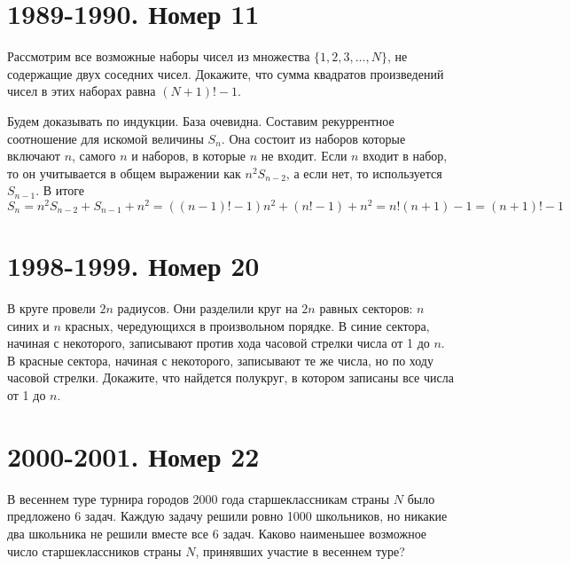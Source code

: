 \documentclass[11pt, a4paper]{problems_template}
\begin{document}
\chapter{1989-1990. Номер 11}

\begin{exercise}
Рассмотрим все возможные наборы чисел из множества $\{1, 2, 3, \dots, N\}$, не содержащие двух соседних чисел. Докажите, что сумма квадратов произведений чисел в этих наборах равна $(N+1)!-1$.
\end{exercise}

\begin{Solution}
Будем доказывать по индукции. База очевидна. Составим рекуррентное соотношение для искомой величины $S_{n}$. Она состоит из наборов которые включают $n$, самого $n$ и наборов, в которые $n$ не входит. Если $n$ входит в набор, то он учитывается в общем выражении как $n^{2}S_{n-2}$, а если нет, то используется $S_{n-1}$. В итоге
$$
S_{n} = n^{2}S_{n-2}+S_{n-1}+n^{2} = ((n-1)! - 1)n^{2} + (n! - 1) + n^{2} = n!(n + 1) - 1 = (n + 1)! - 1
$$  
\end{Solution}

\chapter{1998-1999. Номер 20}

\begin{exercise}
В круге провели $2n$ радиусов. Они разделили круг на $2n$ равных секторов: $n$ синих и $n$ красных, чередующихся в произвольном порядке. В синие сектора, начиная с некоторого, записывают против хода часовой стрелки числа от 1 до $n$. В красные сектора, начиная с некоторого, записывают те же числа, но по ходу часовой стрелки. Докажите, что найдется полукруг, в котором записаны все числа от 1 до $n$.
\end{exercise}

\begin{Solution}

\end{Solution}



\chapter{2000-2001. Номер 22}

\begin{exercise}
В весеннем туре турнира городов 2000 года старшеклассникам страны $N$ было предложено 6 задач. Каждую задачу решили ровно 1000 школьников, но никакие два школьника не решили вместе все 6 задач. Каково наименьшее возможное число старшеклассников страны $N$, принявших участие в весеннем туре?
\end{exercise}
\end{document}
